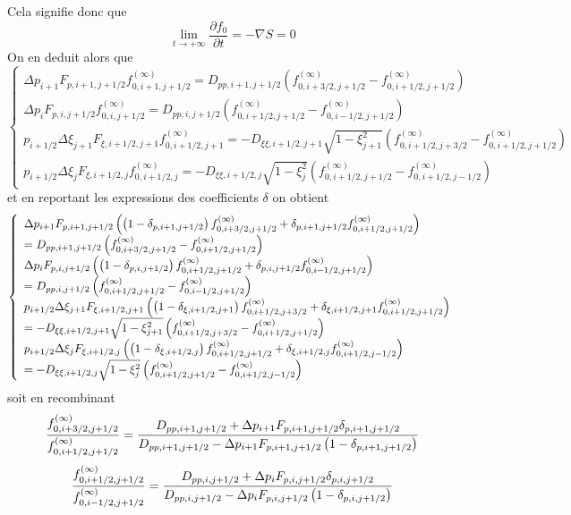 Cela signifie donc que 
\[
\lim_{t\rightarrow+\infty}\frac{\partial f_{0}}{\partial t}=-\nabla S=0
\]
On en deduit alors que 
\[
\left\{ 
\begin{array}{l}
\Delta
p_{i+1}F_{p,i+1,j+1/2}f_{0,i+1,j+1/2}^{(\infty)}=D_{pp,i+1,j+1/2}%
\left(f_{0,i+3/2,j+1/2}^{(\infty)}-f_{0,i+1/2,j+1/2}^{(\infty)}\right) \\ 
\Delta
p_{i}F_{p,i,j+1/2}f_{0,i,j+1/2}^{(\infty)}=D_{pp,i,j+1/2}%
\left(f_{0,i+1/2,j+1/2}^{(\infty)}-f_{0,i-1/2,j+1/2}^{(\infty)}\right) \\ 
p_{i+1/2}\Delta\xi_{j+1}F_{\xi,i+1/2,j+1}f_{0,i+1/2,j+1}^{(\infty)}=-D_{\xi%
\xi,i+1/2,j+1}\sqrt{1-\xi_{j+1}^{2}}\left(f_{0,i+1/2,j+3/2}^{(%
\infty)}-f_{0,i+1/2,j+1/2}^{(\infty)}\right) \\ 
p_{i+1/2}\Delta\xi_{j}F_{\xi,i+1/2,j}f_{0,i+1/2,j}^{(\infty)}=-D_{\xi%
\xi,i+1/2,j}\sqrt{1-\xi_{j}^{2}}\left(f_{0,i+1/2,j+1/2}^{(%
\infty)}-f_{0,i+1/2,j-1/2}^{(\infty)}\right)
\end{array}
\right.
\]
et en reportant les expressions des coefficients $\delta$ on obtient 
\[
\left\{ 
\begin{array}{l}
\Delta
p_{i+1}F_{p,i+1,j+1/2}\left(\left(1-\delta_{p,i+1,j+1/2}%
\right)f_{0,i+3/2,j+1/2}^{(\infty)}+\delta_{p,i+1,j+1/2}f_{0,i+1/2,j+1/2}^{(%
\infty)}\right) \\ 
=D_{pp,i+1,j+1/2}\left(f_{0,i+3/2,j+1/2}^{(\infty)}-f_{0,i+1/2,j+1/2}^{(%
\infty)}\right) \\ 
\Delta
p_{i}F_{p,i,j+1/2}\left(\left(1-\delta_{p,i,j+1/2}%
\right)f_{0,i+1/2,j+1/2}^{(\infty)}+\delta_{p,i,j+1/2}f_{0,i-1/2,j+1/2}^{(%
\infty)}\right) \\ 
=D_{pp,i,j+1/2}\left(f_{0,i+1/2,j+1/2}^{(\infty)}-f_{0,i-1/2,j+1/2}^{(%
\infty)}\right) \\ 
p_{i+1/2}\Delta\xi_{j+1}F_{\xi,i+1/2,j+1}\left(\left(1-\delta_{%
\xi,i+1/2,j+1}\right)f_{0,i+1/2,j+3/2}^{(\infty)}+\delta_{%
\xi,i+1/2,j+1}f_{0,i+1/2,j+1/2}^{(\infty)}\right) \\ 
=-D_{\xi\xi,i+1/2,j+1}\sqrt{1-\xi_{j+1}^{2}}\left(f_{0,i+1/2,j+3/2}^{(%
\infty)}-f_{0,i+1/2,j+1/2}^{(\infty)}\right) \\ 
p_{i+1/2}\Delta\xi_{j}F_{\xi,i+1/2,j}\left(\left(1-\delta_{\xi,i+1/2,j}%
\right)f_{0,i+1/2,j+1/2}^{(\infty)}+\delta_{\xi,i+1/2,j}f_{0,i+1/2,j-1/2}^{(%
\infty)}\right) \\ 
=-D_{\xi\xi,i+1/2,j}\sqrt{1-\xi_{j}^{2}}\left(f_{0,i+1/2,j+1/2}^{(%
\infty)}-f_{0,i+1/2,j-1/2}^{(\infty)}\right)
\end{array}
\right.
\]
soit en recombinant 
\[
\frac{f_{0,i+3/2,j+1/2}^{(\infty)}}{f_{0,i+1/2,j+1/2}^{(\infty)}}=\frac{%
D_{pp,i+1,j+1/2}+\Delta p_{i+1}F_{p,i+1,j+1/2}\delta_{p,i+1,j+1/2}}{%
D_{pp,i+1,j+1/2}-\Delta
p_{i+1}F_{p,i+1,j+1/2}\left(1-\delta_{p,i+1,j+1/2}\right)}
\]
\[
\frac{f_{0,i+1/2,j+1/2}^{(\infty)}}{f_{0,i-1/2,j+1/2}^{(\infty)}}=\frac{%
D_{pp,i,j+1/2}+\Delta p_{i}F_{p,i,j+1/2}\delta_{p,i,j+1/2}}{%
D_{pp,i,j+1/2}-\Delta p_{i}F_{p,i,j+1/2}\left(1-\delta_{p,i,j+1/2}\right)}
\]

